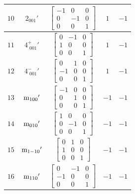 \documentclass[fleqn,8pt]{jsarticle}
\begin{document}
\begin{longtable}{ccccc}
$ 10 $ & $ 2{}_{001}{}' $ & $ \begin{bmatrix} -1 & 0 & 0 \\ 0 & -1 & 0 \\ 0 & 0 & 1 \end{bmatrix} $ & $ 1 $ & $ -1 $ \\ \hline
$ 11 $ & $ 4^{+}_{\,\,001}{}' $ & $ \begin{bmatrix} 0 & -1 & 0 \\ 1 & 0 & 0 \\ 0 & 0 & 1 \end{bmatrix} $ & $ 1 $ & $ -1 $ \\ \hline
$ 12 $ & $ 4^{-}_{\,\,001}{}' $ & $ \begin{bmatrix} 0 & 1 & 0 \\ -1 & 0 & 0 \\ 0 & 0 & 1 \end{bmatrix} $ & $ 1 $ & $ -1 $ \\ \hline
$ 13 $ & $ {\rm m}_{100}{}' $ & $ \begin{bmatrix} -1 & 0 & 0 \\ 0 & 1 & 0 \\ 0 & 0 & 1 \end{bmatrix} $ & $ -1 $ & $ -1 $ \\ \hline
$ 14 $ & $ {\rm m}_{010}{}' $ & $ \begin{bmatrix} 1 & 0 & 0 \\ 0 & -1 & 0 \\ 0 & 0 & 1 \end{bmatrix} $ & $ -1 $ & $ -1 $ \\ \hline
$ 15 $ & $ {\rm m}_{1-10}{}' $ & $ \begin{bmatrix} 0 & 1 & 0 \\ 1 & 0 & 0 \\ 0 & 0 & 1 \end{bmatrix} $ & $ -1 $ & $ -1 $ \\ \hline
$ 16 $ & $ {\rm m}_{110}{}' $ & $ \begin{bmatrix} 0 & -1 & 0 \\ -1 & 0 & 0 \\ 0 & 0 & 1 \end{bmatrix} $ & $ -1 $ & $ -1 $ \\
\end{longtable}
\end{document}
